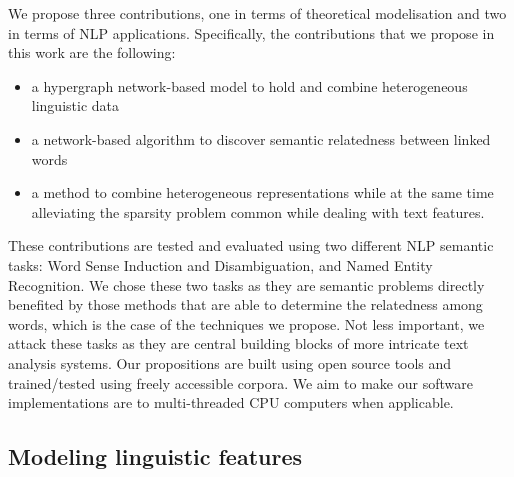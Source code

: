We propose three contributions, one in terms of theoretical modelisation and two in terms of NLP applications. Specifically, the contributions that we propose in this work are the following:
\begin{itemize}
\item a hypergraph network-based model to hold and combine heterogeneous linguistic data %
\item a network-based algorithm to discover semantic relatedness between linked words
\item a method to combine heterogeneous representations while at the same time alleviating the sparsity problem common while dealing with text features.
\end{itemize}
These contributions are tested and evaluated using two different NLP semantic tasks: Word Sense Induction and Disambiguation, and Named Entity Recognition. We chose these two tasks as they are semantic problems directly benefited by those methods  that are able to determine the relatedness among words, which is the case of the techniques we propose. Not less important, we attack these tasks as they are central building blocks of more intricate text analysis systems. Our propositions are built using open source tools and trained/tested using freely accessible corpora. We aim to make our software implementations are  to multi-threaded CPU computers when applicable.


\subsection{Modeling linguistic features}
